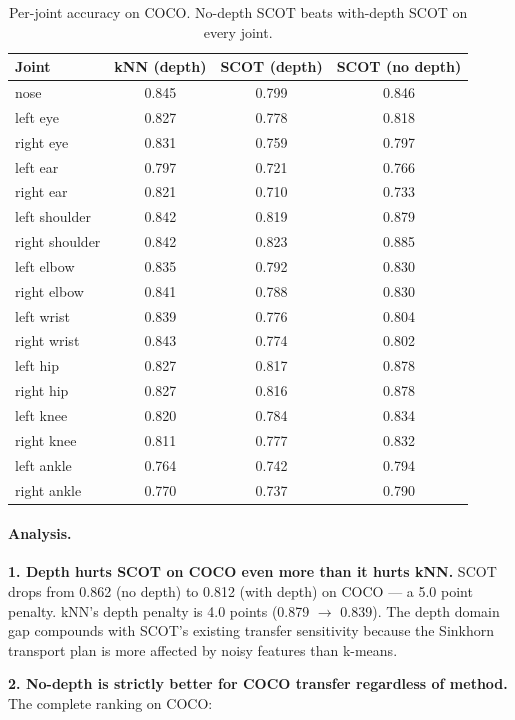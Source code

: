 \begin{table}[H]
\centering
\footnotesize
\begin{tabular}{lccc}
\toprule
Joint & kNN (depth) & SCOT (depth) & SCOT (no depth) \\
\midrule
nose & 0.845 & 0.799 & 0.846 \\
left eye & 0.827 & 0.778 & 0.818 \\
right eye & 0.831 & 0.759 & 0.797 \\
left ear & 0.797 & 0.721 & 0.766 \\
right ear & 0.821 & 0.710 & 0.733 \\
left shoulder & 0.842 & 0.819 & 0.879 \\
right shoulder & 0.842 & 0.823 & 0.885 \\
left elbow & 0.835 & 0.792 & 0.830 \\
right elbow & 0.841 & 0.788 & 0.830 \\
left wrist & 0.839 & 0.776 & 0.804 \\
right wrist & 0.843 & 0.774 & 0.802 \\
left hip & 0.827 & 0.817 & 0.878 \\
right hip & 0.827 & 0.816 & 0.878 \\
left knee & 0.820 & 0.784 & 0.834 \\
right knee & 0.811 & 0.777 & 0.832 \\
left ankle & 0.764 & 0.742 & 0.794 \\
right ankle & 0.770 & 0.737 & 0.790 \\
\bottomrule
\end{tabular}
\caption{Per-joint accuracy on COCO. No-depth SCOT beats with-depth SCOT on every joint.}
\end{table}


\paragraph{Analysis.}

\textbf{1. Depth hurts SCOT on COCO even more than it hurts kNN.} SCOT drops from 0.862 (no depth) to 0.812 (with depth) on COCO --- a 5.0 point penalty. kNN's depth penalty is 4.0 points (0.879 $\to$ 0.839). The depth domain gap compounds with SCOT's existing transfer sensitivity because the Sinkhorn transport plan is more affected by noisy features than k-means.

\textbf{2. No-depth is strictly better for COCO transfer regardless of method.} The complete ranking on COCO:

